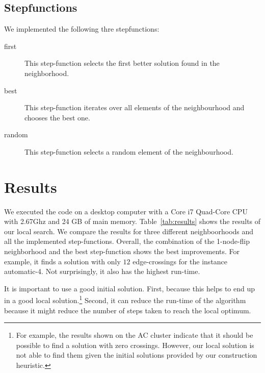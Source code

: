 \documentclass{scrartcl}
\begin{document}
\subsection{Stepfunctions}

We implemented the following thre stepfunctions:

\begin{description}
\item[first] This step-function selects the first better solution found in the neighborhood.
\item[best] This step-function iterates over all elements of the neighbourhood and chooses the best one.
\item[random] This step-function selects a random element of the neighbourhood. 
\end{description}




\section{Results}
We executed the code on a desktop computer with a Core i7 Quad-Core
CPU with 2.67Ghz and 24 GB of main memory. Table~\ref{tab:results}
shows the results of our local search. We compare the results for
three different neighboorhoods and all the implemented step-functions.
Overall, the combination of the 1-node-flip neighborhood and the best
step-function shows the best improvements. For example, it finds a
solution with only $12$ edge-crossings for the instance automatic-4.
Not surprisingly, it also has the highest run-time.

It is important to use a good initial solution. First, because this
helps to end up in a good local solution.\footnote{For example, the
  results shown on the AC cluster indicate that it should be possible
  to find a solution with zero crossings. However, our local solution
  is not able to find them given the initial solutions provided by our
  construction heuristic.} Second, it can reduce the run-time of the
algorithm because it might reduce the number of steps taken to reach
the local optimum.
\end{document}
